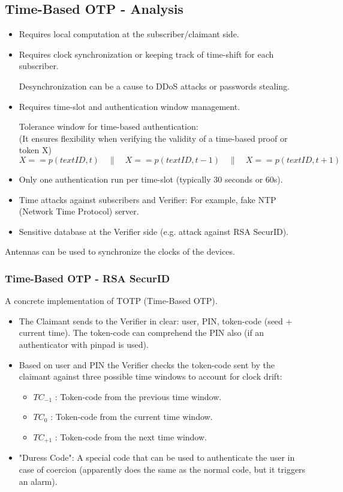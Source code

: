 \subsection*{Time-Based OTP - Analysis}
\begin{itemize}
    \item Requires local computation at the subscriber/claimant side.
    \item Requires clock synchronization or keeping track of time-shift for each subscriber.
    
    Desynchronization can be a cause to DDoS attacks or passwords stealing.
    \item Requires time-slot and authentication window management.
    
    Tolerance window for time-based authentication:
    \\\hspace*{1cm}(It ensures flexibility when verifying the validity of a time-based proof or token  X)
    \[
        X==p(text{ID}, t) \quad \| \quad X == p(text{ID}, t-1) \quad \| \quad X == p(text{ID}, t+1)
    \]
    \item Only one authentication run per time-slot (typically 30 seconds or 60s).
    \item Time attacks against subscribers and Verifier: For example, fake NTP (Network Time Protocol) server.
    \item Sensitive database at the Verifier side  (e.g. attack against RSA SecurID).
\end{itemize}
\begin{tcolorbox}[colback=blue!10!white, colframe=blue!50!white]
Antennas can be used to synchronize the clocks of the devices.
\end{tcolorbox}

\subsubsection*{Time-Based OTP - RSA SecurID}
\begin{center}
    A concrete implementation of TOTP (Time-Based OTP).
\end{center}
\begin{itemize}
    \item The Claimant sends to the Verifier in clear: user, PIN, token-code (seed + current time). The token-code can comprehend the PIN also (if an authenticator with pinpad is used).
    \item Based on user and PIN the Verifier checks the token-code sent by the claimant against three possible time windows to account for clock drift:
    \begin{itemize}
        \item  $TC_{-1}$ : Token-code from the previous time window.
        \item $TC_0$ : Token-code from the current time window.
        \item $TC_{+1}$ : Token-code from the next time window.
    \end{itemize}
    \item "Duress Code": A special code that can be used to authenticate the user in case of coercion (apparently does the same as the normal code, but it triggers an alarm).
\end{itemize}
